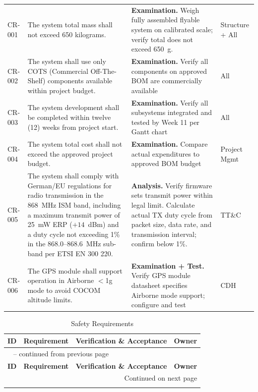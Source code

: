 \begin{landscape}
\begin{longtable}{p{1.4cm}p{8.2cm}p{10.2cm}p{1.9cm}}
CR-001 & The system total mass shall not exceed 650 kilograms. & \textbf{Examination.} Weigh fully assembled flyable system on calibrated scale; verify total does not exceed 650~g. & Structure + All \\
CR-002 & The system shall use only COTS (Commercial Off-The-Shelf) components available within project budget. & \textbf{Examination.} Verify all components on approved BOM are commercially available & All \\
CR-003 & The system development shall be completed within twelve (12) weeks from project start. & \textbf{Examination.} Verify all subsystems integrated and tested by Week 11 per Gantt chart & All \\
CR-004 & The system total cost shall not exceed the approved project budget. & \textbf{Examination.} Compare actual expenditures to approved BOM budget & Project Mgmt \\
CR-005 & The system shall comply with German/EU regulations for radio transmission in the 868~MHz ISM band, including a maximum transmit power of 25~mW ERP ($+14$~dBm) and a duty cycle not exceeding 1\% in the 868.0--868.6~MHz sub-band per ETSI EN 300 220. & \textbf{Analysis.} Verify firmware sets transmit power within legal limit. Calculate actual TX duty cycle from packet size, data rate, and transmission interval; confirm below 1\%. & TT\&C \\
CR-006 & The GPS module shall support operation in Airborne $<$1g mode to avoid COCOM altitude limits. & \textbf{Examination + Test.} Verify GPS module datasheet specifies Airborne mode support; configure and test & CDH \\
\end{longtable}

\begin{longtable}{p{1.4cm}p{8.2cm}p{10.2cm}p{1.9cm}}
\caption{Safety Requirements}
\label{tab:req-safety} \\
\toprule
\textbf{ID} & \textbf{Requirement} & \textbf{Verification \& Acceptance} & \textbf{Owner} \\
\midrule
\endfirsthead
\multicolumn{4}{l}{\tablename\ \thetable{} -- continued from previous page} \\
\toprule
\textbf{ID} & \textbf{Requirement} & \textbf{Verification \& Acceptance} & \textbf{Owner} \\
\midrule
\endhead
\midrule
\multicolumn{4}{r}{Continued on next page} \\
\endfoot
\bottomrule
\endlastfoot


\end{longtable}
\end{landscape}
